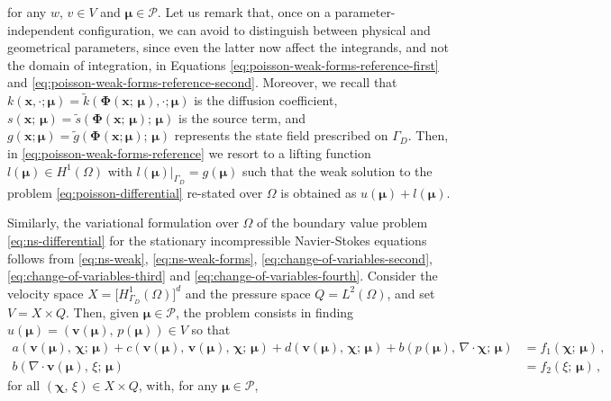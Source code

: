 \documentclass[12pt, a4paper, twoside, openright]{report}
\numberwithin{equation}{chapter}
\theoremstyle{theorem}
\theoremstyle{definition}
\theoremstyle{remark}
\theoremstyle{proposition}
\numberwithin{figure}{chapter}
\newcommand{\wt}[1]{\widetilde{#1}}
\newcommand{\bg}[1]{\boldsymbol{#1}}
\begin{document}
		for any $w$, $v \in V$ and $\bg{\mu} \in \mathcal{P}$. Let us remark that, once on a parameter-independent configuration, we can avoid to distinguish between physical and geometrical parameters, since even the latter now affect the integrands, and not the domain of integration, in Equations \eqref{eq:poisson-weak-forms-reference-first} and \eqref{eq:poisson-weak-forms-reference-second}. Moreover, we recall that $k(\bg{x}, \cdot; \bg{\mu}) = \wt{k}(\bg{\Phi}(\bg{x}; \, \bg{\mu}), \cdot; \bg{\mu})$ is the diffusion coefficient, $s(\bg{x}; \, \bg{\mu}) = \wt{s}(\bg{\Phi}(\bg{x}; \, \bg{\mu}); \, \bg{\mu})$ is the source term, and $g(\bg{x}; \bg{\mu}) = \wt{g}(\bg{\Phi}(\bg{x}; \bg{\mu}); \, \bg{\mu})$ represents the state field prescribed on $\Gamma_D$. Then, in \eqref{eq:poisson-weak-forms-reference} we resort to a lifting function $l(\bg{\mu}) \in H^1(\Omega)$ with $l(\bg{\mu}) \big\rvert_{\Gamma_D} = g(\bg{\mu})$ such that the weak solution to the problem \eqref{eq:poisson-differential} re-stated over $\Omega$ is obtained as $u(\bg{\mu}) + l(\bg{\mu})$.
		
		Similarly, the variational formulation over $\Omega$ of the boundary value problem \eqref{eq:ns-differential} for the stationary incompressible Navier-Stokes equations follows from \eqref{eq:ns-weak}, \eqref{eq:ns-weak-forms}, \eqref{eq:change-of-variables-second}, \eqref{eq:change-of-variables-third} and \eqref{eq:change-of-variables-fourth}. Consider the velocity space $X = \big[ H_{\Gamma_D}^1(\Omega) \big]^d$ and the pressure space $Q = L^2(\Omega)$, and set $V = X \times Q$. Then, given $\bg{\mu} \in \mathcal{P}$, the problem consists in finding $u(\bg{\mu}) = (\bg{v}(\bg{\mu}), \, p(\bg{\mu})) \in V$ so that
		\begin{subequations}
			\label{eq:ns-weak-reference}
			\begin{align}
				a(\bg{v}(\bg{\mu}), \, \bg{\chi}; \, \bg{\mu}) + c(\bg{v}(\bg{\mu}), \, \bg{v}(\bg{\mu}), \, \bg{\chi}; \, \bg{\mu}) + d(\bg{v}(\bg{\mu}), \, \bg{\chi}; \, \bg{\mu}) + b(p(\bg{\mu}), \, \nabla \cdot \bg{\chi}; \, \bg{\mu}) & = f_1(\bg{\chi}; \, \bg{\mu}) \, , \\
				b(\nabla \cdot \bg{v}(\bg{\mu}), \, \xi; \, \bg{\mu}) & = f_2(\xi; \, \bg{\mu}) \, ,
			\end{align}
		\end{subequations}
		for all $(\bg{\chi}, \, \xi) \in X \times Q$, with, for any $\bg{\mu} \in \mathcal{P}$,	
					
\end{document}
